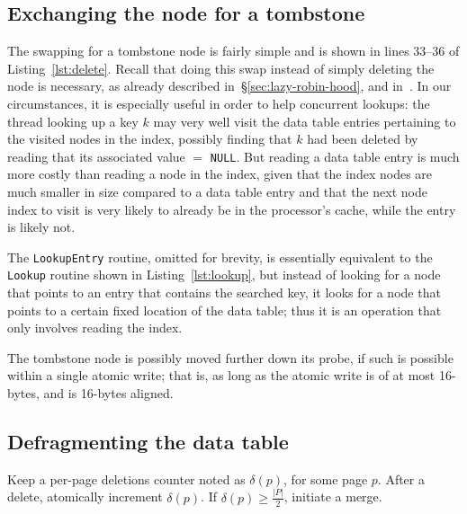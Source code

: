 \subsection{Exchanging the node for a tombstone}\label{subsec:exchanging-node-tombstone}

The swapping for a tombstone node is fairly simple and is shown in lines 33--36 of Listing~\ref{lst:delete}.
Recall that doing this swap instead of simply deleting the node is necessary, as already described in~\S\ref{sec:lazy-robin-hood}, and in~\cite[\S6.4]{the-art-vol-2}.
In our circumstances, it is especially useful in order to help concurrent lookups: the thread looking up a key $k$ may very well visit the data table entries pertaining to the visited nodes in the index, possibly finding that $k$ had been deleted by reading that its associated value $=$ \texttt{NULL}.
But reading a data table entry is much more costly than reading a node in the index, given that the index nodes are much smaller in size compared to a data table entry and that the next node index to visit is very likely to already be in the processor's cache, while the entry is likely not.

The \texttt{LookupEntry} routine, omitted for brevity, is essentially equivalent to the \texttt{Lookup} routine shown in Listing~\ref{lst:lookup}, but instead of looking for a node that points to an entry that contains the searched key, it looks for a node that points to a certain fixed location of the data table; thus it is an operation that only involves reading the index.

The tombstone node is possibly moved further down its probe, if such is possible within a single atomic write; that is, as long as the atomic write is of at most 16-bytes, and is 16-bytes aligned.


\subsection{Defragmenting the data table}\label{subsec:defragmenting}

Keep a per-page deletions counter noted as $\delta(p)$, for some page $p$.
After a delete, atomically increment $\delta(p)$.
If $\delta(p) \geq \frac{|P|}{2}$, initiate a merge.

